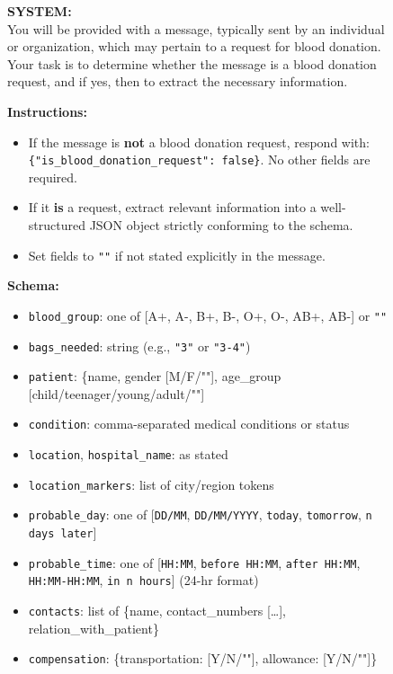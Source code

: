 \documentclass[11pt]{article}
\begin{document}
\begin{figure}[t]
\centering
\begin{tcolorbox}[title=\textbf{Few-shot Prompt for Blood Donation Request Parsing}, width=0.95\textwidth, colback=white]
\textbf{SYSTEM:} \\
You will be provided with a message, typically sent by an individual or organization, which may pertain to a request for blood donation. Your task is to determine whether the message is a blood donation request, and if yes, then to extract the necessary information. 

\textbf{Instructions:}
\begin{itemize}
    \item If the message is \textbf{not} a blood donation request, respond with: \verb|{"is_blood_donation_request": false}|. No other fields are required.
    \item If it \textbf{is} a request, extract relevant information into a well-structured JSON object strictly conforming to the schema.
    \item Set fields to \verb|""| if not stated explicitly in the message.
\end{itemize}

\textbf{Schema:}
\begin{itemize}
    \item \texttt{blood\_group}: one of [A+, A-, B+, B-, O+, O-, AB+, AB-] or \verb|""|
    \item \texttt{bags\_needed}: string (e.g., \verb|"3"| or \verb|"3-4"|)
    \item \texttt{patient}: \{name, gender [M/F/""], age\_group [child/teenager/young/adult/""]
    \item \texttt{condition}: comma-separated medical conditions or status
    \item \texttt{location}, \texttt{hospital\_name}: as stated
    \item \texttt{location\_markers}: list of city/region tokens
    \item \texttt{probable\_day}: one of [\texttt{DD/MM}, \texttt{DD/MM/YYYY}, \texttt{today}, \texttt{tomorrow}, \texttt{n days later}]
    \item \texttt{probable\_time}: one of [\texttt{HH:MM}, \texttt{before HH:MM}, \texttt{after HH:MM}, \texttt{HH:MM-HH:MM}, \texttt{in n hours}] (24-hr format)
    \item \texttt{contacts}: list of \{name, contact\_numbers [\ldots], relation\_with\_patient\}
    \item \texttt{compensation}: \{transportation: [Y/N/""], allowance: [Y/N/""]\}
\end{itemize}


\end{tcolorbox}
\end{figure}
\end{document}
